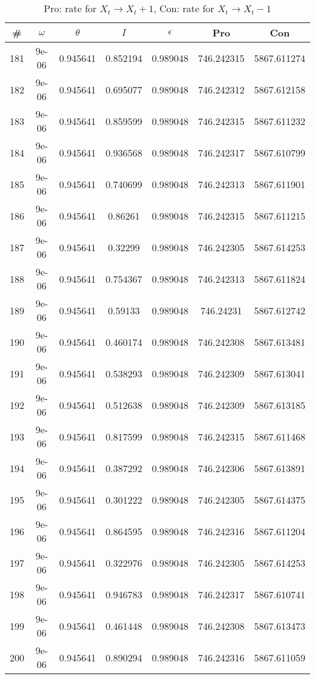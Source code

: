 \newpage
\begin{table}
\caption{Pro: rate for $X_t \rightarrow X_t + 1$, Con: rate for $X_t \rightarrow X_t - 1$}
\begin{tabular*}{\linewidth}{c|c|c|c|c|c|c}
\# & $\omega$ & $\theta$ & $I$ & $\epsilon$ & Pro & Con \\
\hline
181 & 9e-06 & 0.945641 & 0.852194 & 0.989048 & 746.242315 & 5867.611274\\
182 & 9e-06 & 0.945641 & 0.695077 & 0.989048 & 746.242312 & 5867.612158\\
183 & 9e-06 & 0.945641 & 0.859599 & 0.989048 & 746.242315 & 5867.611232\\
184 & 9e-06 & 0.945641 & 0.936568 & 0.989048 & 746.242317 & 5867.610799\\
185 & 9e-06 & 0.945641 & 0.740699 & 0.989048 & 746.242313 & 5867.611901\\
186 & 9e-06 & 0.945641 & 0.86261 & 0.989048 & 746.242315 & 5867.611215\\
187 & 9e-06 & 0.945641 & 0.32299 & 0.989048 & 746.242305 & 5867.614253\\
188 & 9e-06 & 0.945641 & 0.754367 & 0.989048 & 746.242313 & 5867.611824\\
189 & 9e-06 & 0.945641 & 0.59133 & 0.989048 & 746.24231 & 5867.612742\\
190 & 9e-06 & 0.945641 & 0.460174 & 0.989048 & 746.242308 & 5867.613481\\
191 & 9e-06 & 0.945641 & 0.538293 & 0.989048 & 746.242309 & 5867.613041\\
192 & 9e-06 & 0.945641 & 0.512638 & 0.989048 & 746.242309 & 5867.613185\\
193 & 9e-06 & 0.945641 & 0.817599 & 0.989048 & 746.242315 & 5867.611468\\
194 & 9e-06 & 0.945641 & 0.387292 & 0.989048 & 746.242306 & 5867.613891\\
195 & 9e-06 & 0.945641 & 0.301222 & 0.989048 & 746.242305 & 5867.614375\\
196 & 9e-06 & 0.945641 & 0.864595 & 0.989048 & 746.242316 & 5867.611204\\
197 & 9e-06 & 0.945641 & 0.322976 & 0.989048 & 746.242305 & 5867.614253\\
198 & 9e-06 & 0.945641 & 0.946783 & 0.989048 & 746.242317 & 5867.610741\\
199 & 9e-06 & 0.945641 & 0.461448 & 0.989048 & 746.242308 & 5867.613473\\
200 & 9e-06 & 0.945641 & 0.890294 & 0.989048 & 746.242316 & 5867.611059\\

\end{tabular*}
\end{table}
